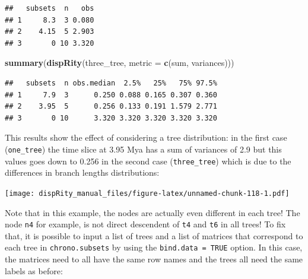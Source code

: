 \documentclass[]{book}
\newenvironment{Shaded}{\begin{snugshade}}{\end{snugshade}}
\newcommand{\ControlFlowTok}[1]{\textcolor[rgb]{0.13,0.29,0.53}{\textbf{#1}}}
\newcommand{\DataTypeTok}[1]{\textcolor[rgb]{0.13,0.29,0.53}{#1}}
\newcommand{\DecValTok}[1]{\textcolor[rgb]{0.00,0.00,0.81}{#1}}
\newcommand{\FloatTok}[1]{\textcolor[rgb]{0.00,0.00,0.81}{#1}}
\newcommand{\KeywordTok}[1]{\textcolor[rgb]{0.13,0.29,0.53}{\textbf{#1}}}
\newcommand{\NormalTok}[1]{#1}
\newcommand{\OperatorTok}[1]{\textcolor[rgb]{0.81,0.36,0.00}{\textbf{#1}}}
\newcommand{\StringTok}[1]{\textcolor[rgb]{0.31,0.60,0.02}{#1}}
\begin{document}
\begin{verbatim}
##   subsets  n   obs
## 1     8.3  3 0.080
## 2    4.15  5 2.903
## 3       0 10 3.320
\end{verbatim}

\begin{Shaded}
\begin{Highlighting}[]
\KeywordTok{summary}\NormalTok{(}\KeywordTok{dispRity}\NormalTok{(three_tree, }\DataTypeTok{metric =} \KeywordTok{c}\NormalTok{(sum, variances)))}
\end{Highlighting}
\end{Shaded}

\begin{verbatim}
##   subsets  n obs.median  2.5%   25%   75% 97.5%
## 1     7.9  3      0.250 0.088 0.165 0.307 0.360
## 2    3.95  5      0.256 0.133 0.191 1.579 2.771
## 3       0 10      3.320 3.320 3.320 3.320 3.320
\end{verbatim}

This results show the effect of considering a tree distribution: in the first case (\texttt{one\_tree}) the time slice at 3.95 Mya has a sum of variances of 2.9 but this values goes down to 0.256 in the second case (\texttt{three\_tree}) which is due to the differences in branch lengths distributions:

\begin{Shaded}
\end{Shaded}

\texttt{[image: dispRity\_manual\_files/figure-latex/unnamed-chunk-118-1.pdf]}

Note that in this example, the nodes are actually even different in each tree! The node \texttt{n4} for example, is not direct descendent of \texttt{t4} and \texttt{t6} in all trees!
To fix that, it is possible to input a list of trees and a list of matrices that correspond to each tree in \texttt{chrono.subsets} by using the \texttt{bind.data\ =\ TRUE} option.
In this case, the matrices need to all have the same row names and the trees all need the same labels as before:
\end{document}
